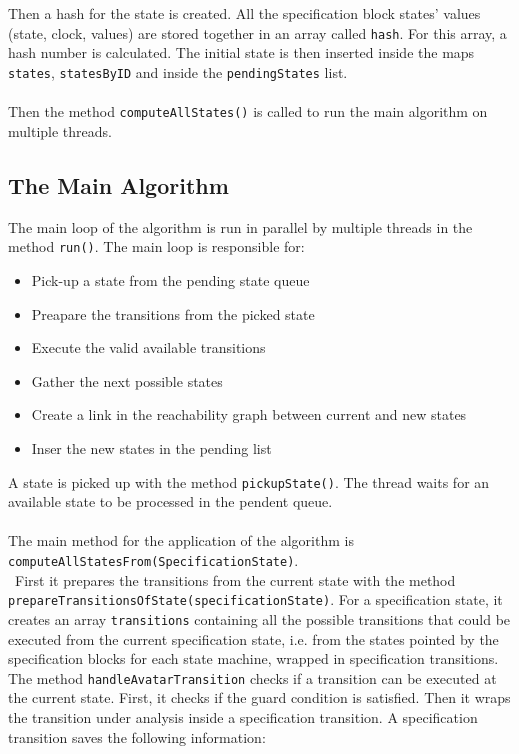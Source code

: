 \documentclass[12pt]{article}
\begin{document}
\\\\
Then a hash for the state is created. All the specification block states' values (state, clock, values) are stored together in an array called \texttt{hash}. For this array, a hash number is calculated. The initial state is then inserted inside the maps \texttt{states}, \texttt{statesByID} and inside the \texttt{pendingStates} list.
\\\\
Then the method \texttt{computeAllStates()} is called to run the main algorithm on multiple threads.

\subsection{The Main Algorithm}
The main loop of the algorithm is run in parallel by multiple threads in the method \texttt{run()}. The main loop is responsible for:
\begin{itemize}
\item Pick-up a state from the pending state queue
\item Preapare the transitions from the picked state
\item Execute the valid available transitions
\item Gather the next possible states
\item Create a link in the reachability graph between current and new states
\item Inser the new states in the pending list
\end{itemize}
A state is picked up with the method \texttt{pickupState()}. The thread waits for an available state to be processed in the pendent queue.
\\\\
The main method for the application of the algorithm is \texttt{computeAllStatesFrom(SpecificationState)}. \\\
First it prepares the transitions from the current state with the method \texttt{prepareTransitionsOfState(specificationState)}. For a specification state, it creates an array \texttt{transitions} containing all the possible transitions that could be executed from the current specification state, i.e. from the states pointed by the specification blocks for each state machine, wrapped in specification transitions. \\
The method \texttt{handleAvatarTransition} checks if a transition can be executed at the current state. First, it checks if the guard condition is satisfied. Then it wraps the transition under analysis inside a specification transition. A specification transition saves the following information:
\end{document}

